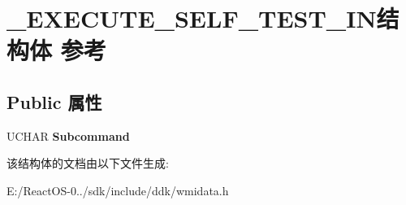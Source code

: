 \hypertarget{struct___e_x_e_c_u_t_e___s_e_l_f___t_e_s_t___i_n}{}\section{\+\_\+\+E\+X\+E\+C\+U\+T\+E\+\_\+\+S\+E\+L\+F\+\_\+\+T\+E\+S\+T\+\_\+\+I\+N结构体 参考}
\label{struct___e_x_e_c_u_t_e___s_e_l_f___t_e_s_t___i_n}
\subsection*{Public 属性}
\begin{DoxyCompactItemize}
\item 
\mbox{\label{struct___e_x_e_c_u_t_e___s_e_l_f___t_e_s_t___i_n_a4ef9186d7a22edeca596dd62c391dbed}} 
U\+C\+H\+AR {\bfseries Subcommand}
\end{DoxyCompactItemize}


该结构体的文档由以下文件生成\+:\begin{DoxyCompactItemize}
\item 
E\+:/\+React\+O\+S-\/0../sdk/include/ddk/wmidata.\+h\end{DoxyCompactItemize}
